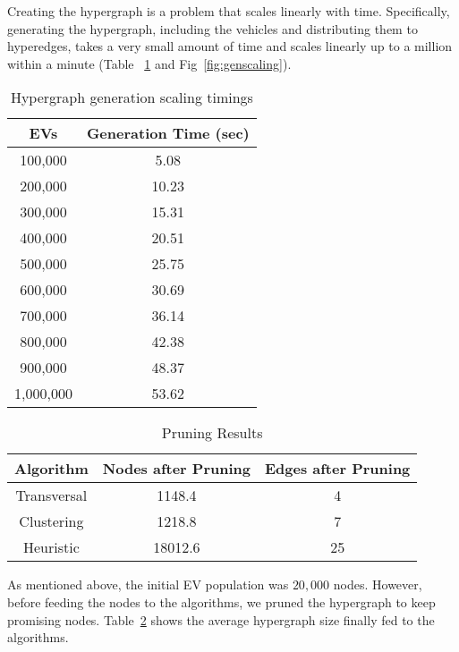 Creating the hypergraph is a problem that scales linearly with time. Specifically, generating the hypergraph, including the vehicles and distributing them to hyperedges, takes a very small amount of time and scales linearly up to a million within a minute (Table ~\ref{tab:genscaling} and Fig~\ref{fig:genscaling}).
	\begin{table}
		\begin{center}
			\begin{tabular}{| c || c | }
				\hline
				EVs & Generation Time (sec) \\ \hline
				100,000  & 5.08\\ \hline
				200,000  & 10.23 \\ \hline
				300,000  & 15.31  \\ \hline
				400,000 & 20.51  \\ \hline
				500,000 & 25.75   \\ \hline
				600,000 & 30.69   \\ \hline
				700,000 & 36.14   \\ \hline
				800,000 & 42.38   \\ \hline
				900,000 & 48.37   \\ \hline
				1,000,000 & 53.62   \\ \hline
			\end{tabular}
		\end{center}    
		\caption{Hypergraph generation scaling timings\label{tab:genscaling}}
	\end{table}
\begin{table}
	\begin{center}
		\begin{tabular}{| c || c | c | }
			\hline
			Algorithm & Nodes after Pruning & Edges after Pruning \\ \hline
			Transversal & 1148.4   & 4  \\ \hline
			Clustering  & 1218.8   & 7 \\ \hline
			Heuristic   & 18012.6  & 25 \\ \hline
		\end{tabular}
	\end{center} 
	\caption{Pruning Results\label{tab:pruningres}}
\end{table}
As mentioned above, the initial EV population was $20,000$ nodes. However, before feeding the nodes to the algorithms, we pruned the hypergraph to keep promising nodes. Table~\ref{tab:pruningres} shows the average hypergraph size finally fed to the algorithms.

